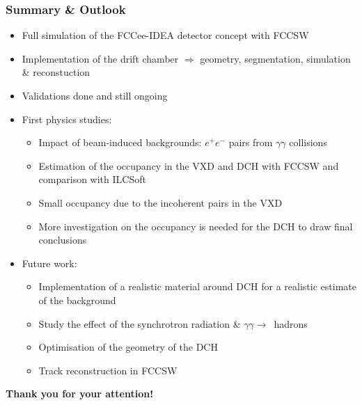 \documentclass[aspectratio=169, hyperref={colorlinks=true,pdfpagelabels=false,linkcolor=black}, xcolor=dvipsnames,10pt]{beamer}
\begin{document}
\label{lastslide}
\begin{frame}
  \frametitle{Summary \& Outlook}
  
  	\vspace{1cm}
	\begin{itemize}
	\item Full simulation of the FCCee-IDEA detector concept with FCCSW \vspace{0.2cm}
	\item Implementation of the drift chamber \vspace{0.2cm}
		$\Rightarrow$ geometry, segmentation, simulation \& reconstuction
	\item Validations done and still ongoing \vspace{0.2cm}
	\item First physics studies: \vspace{0.2cm}
		\begin{itemize}
		\item Impact of beam-induced backgrounds: $e^{+}e^{-}$ pairs from $\gamma\gamma$ collisions
	  	\item Estimation of the occupancy in the VXD and DCH with FCCSW and comparison with ILCSoft
	  	\item Small occupancy due to the incoherent pairs in the VXD
	  	\item More investigation on the occupancy is needed for the DCH to draw final conclusions \vspace{0.2cm}
	  	\end{itemize}
	\item Future work: \vspace{0.2cm}
		\begin{itemize}
		\item Implementation of a realistic material around DCH for a realistic estimate of the background
		\item Study the effect of the synchrotron radiation \& $\gamma\gamma\rightarrow$~hadrons
		\item Optimisation of the geometry of the DCH
		\item Track reconstruction in FCCSW
		\end{itemize}
  	\end{itemize}

	\vspace{1cm}
	\centering
	\Large{\textbf{Thank you for your attention!}}
\end{frame}
\end{document}
